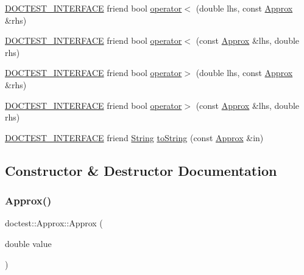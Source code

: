 \begin{DoxyCompactItemize}
\item 
\hyperlink{doctest_8h_a9c16ffc635ec47f07797d21ede26b1a5}{D\+O\+C\+T\+E\+S\+T\+\_\+\+I\+N\+T\+E\+R\+F\+A\+CE} friend bool \hyperlink{classdoctest_1_1Approx_acf32148e34dc6444a3bb4b16e7298279}{operator$<$} (double lhs, const \hyperlink{classdoctest_1_1Approx}{Approx} \&rhs)
\item 
\hyperlink{doctest_8h_a9c16ffc635ec47f07797d21ede26b1a5}{D\+O\+C\+T\+E\+S\+T\+\_\+\+I\+N\+T\+E\+R\+F\+A\+CE} friend bool \hyperlink{classdoctest_1_1Approx_a54ce2536ed164b79688f43e373dcbf7b}{operator$<$} (const \hyperlink{classdoctest_1_1Approx}{Approx} \&lhs, double rhs)
\item 
\hyperlink{doctest_8h_a9c16ffc635ec47f07797d21ede26b1a5}{D\+O\+C\+T\+E\+S\+T\+\_\+\+I\+N\+T\+E\+R\+F\+A\+CE} friend bool \hyperlink{classdoctest_1_1Approx_a97a6e92b9c9dacc0adb2f76f9faf2924}{operator$>$} (double lhs, const \hyperlink{classdoctest_1_1Approx}{Approx} \&rhs)
\item 
\hyperlink{doctest_8h_a9c16ffc635ec47f07797d21ede26b1a5}{D\+O\+C\+T\+E\+S\+T\+\_\+\+I\+N\+T\+E\+R\+F\+A\+CE} friend bool \hyperlink{classdoctest_1_1Approx_a12a93e1726180db4091cb2e3b8ba5e30}{operator$>$} (const \hyperlink{classdoctest_1_1Approx}{Approx} \&lhs, double rhs)
\item 
\hyperlink{doctest_8h_a9c16ffc635ec47f07797d21ede26b1a5}{D\+O\+C\+T\+E\+S\+T\+\_\+\+I\+N\+T\+E\+R\+F\+A\+CE} friend \hyperlink{classdoctest_1_1String}{String} \hyperlink{classdoctest_1_1Approx_aa1ba324952b7844d35fc569b1c6c139a}{to\+String} (const \hyperlink{classdoctest_1_1Approx}{Approx} \&in)
\end{DoxyCompactItemize}


\subsection{Constructor \& Destructor Documentation}
\mbox{\label{classdoctest_1_1Approx_a86f0d1b44c1cf095697f23ccdab00802}} 
\subsubsection{\texorpdfstring{Approx()}{Approx()}}
{\footnotesize\ttfamily doctest\+::\+Approx\+::\+Approx (\begin{DoxyParamCaption}\item[{double}]{value }\end{DoxyParamCaption})\hspace{0.3cm}{\ttfamily [explicit]}}



